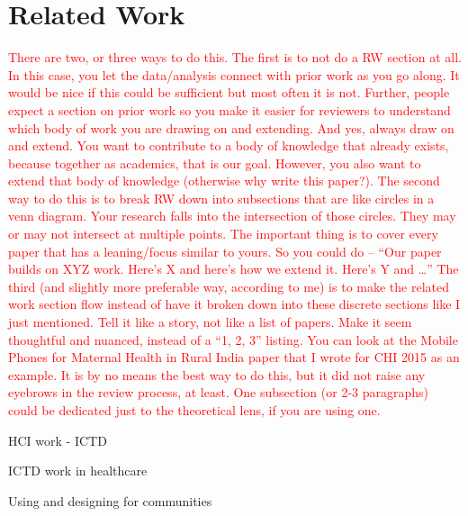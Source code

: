 \section{Related Work}
\textcolor{red}{There are two, or three ways to do this. The first is to not do a RW section at all. In this case, you let the data/analysis connect with prior work as you go along. It would be nice if this could be sufficient but most often it is not. Further, people expect a section on prior work so you make it easier for reviewers to understand which body of work you are drawing on and extending.
 And yes, always draw on and extend. You want to contribute to a body of knowledge that already exists, because together as academics, that is our goal. However, you also want to extend that body of knowledge (otherwise why write this paper?). 
The second way to do this is to break RW down into subsections that are like circles in a venn diagram. Your research falls into the intersection of those circles. They may or may not intersect at multiple points. The important thing is to cover every paper that has a leaning/focus similar to yours. So you could do -- “Our paper builds on XYZ work. Here’s X and here’s how we extend it. Here’s Y and …”
The third (and slightly more preferable way, according to me) is to make the related work section flow instead of have it broken down into these discrete sections like I just mentioned. Tell it like a story, not like a list of papers. Make it seem thoughtful and nuanced, instead of a “1, 2, 3” listing. 
You can look at the Mobile Phones for Maternal Health in Rural India paper that I wrote for CHI 2015 as an example. It is by no means the best way to do this, but it did not raise any eyebrows in the review process, at least. One subsection (or 2-3 paragraphs) could be dedicated just to the theoretical lens, if you are using one.
}

HCI work - ICTD

ICTD work in healthcare

Using and designing for communities